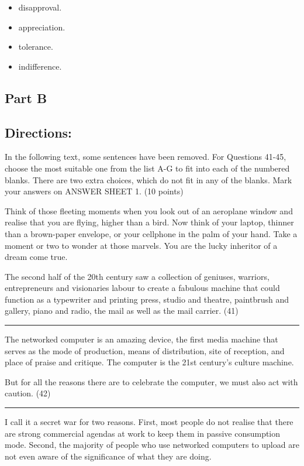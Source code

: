 \documentclass[UTF8,11pt]{ctexart}
\begin{document}
\begin{itemize}[leftmargin=2em,itemsep=.2em,topsep=.4em]\item[A.] disapproval.
\item[B.] appreciation.
\item[C.] tolerance.
\item[D.] indifference.
\end{itemize}

\subsection*{\textbf{Part B}}


\subsection*{\textbf{Directions:}}


In the following text, some sentences have been removed. For Questions 41-45, choose the most suitable one from the list A-G to fit into each of the numbered blanks. There are two extra choices, which do not fit in any of the blanks. Mark your answers on ANSWER SHEET 1. (10 points)


Think of those fleeting moments when you look out of an aeroplane window and realise that you are flying, higher than a bird. Now think of your laptop, thinner than a brown-paper envelope, or your cellphone in the palm of your hand. Take a moment or two to wonder at those marvels. You are the lucky inheritor of a dream come true.


The second half of the 20th century saw a collection of geniuses, warriors, entrepreneurs and visionaries labour to create a fabulous machine that could function as a typewriter and printing press, studio and theatre, paintbrush and gallery, piano and radio, the mail as well as the mail carrier. (41) \par\noindent\rule{.95\linewidth}{.4pt}\par


The networked computer is an amazing device, the first media machine that serves as the mode of production, means of distribution, site of reception, and place of praise and critique. The computer is the 21st century’s culture machine.


But for all the reasons there are to celebrate the computer, we must also act with caution. (42) \par\noindent\rule{.95\linewidth}{.4pt}\par  I call it a secret war for two reasons. First, most people do not realise that there are strong commercial agendas at work to keep them in passive consumption mode. Second, the majority of people who use networked computers to upload are not even aware of the significance of what they are doing.
\end{document}
